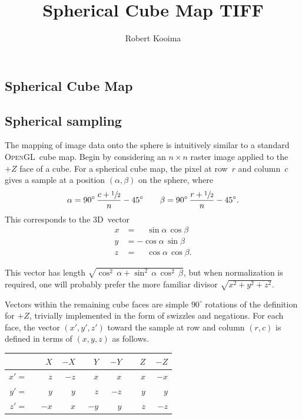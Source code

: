 \documentclass[oneside,11pt]{memoir}
\newcommand{\threed}  {3D}
\newcommand{\opengl}  {\textsc{OpenGL}}
\newcommand{\B}{\bigstrut[b]}
\newcommand{\T}{\bigstrut[t]}
\newcommand{\Pos}[1]{\phantom{-}{#1}}
\newcommand{\Neg}[1]{        {-}{#1}}
\begin{document}
\title{Spherical Cube Map TIFF}
\author{Robert Kooima}
\maketitle
\begin{Spacing}{1.1}




\chapter{Spherical Cube Map}

\section{Spherical sampling}

The mapping of image data onto the sphere is intuitively similar to a standard \opengl\ cube map. Begin by considering an $n\times n$ raster image applied to the $+Z$ face of a cube. For a spherical cube map, the pixel at row~$r$ and column~$c$ gives a sample at a position $(\alpha, \beta)$ on the sphere, where
\[\alpha=90^{\circ}\,\frac{c + \sfrac{1}{2}}{n} - 45^{\circ}\qquad\beta=90^{\circ}\,\frac{r + \sfrac{1}{2}}{n} - 45^{\circ}.\]
This corresponds to the \threed\ vector
\begin{align*}
x& = \phantom{-}\sin\alpha\, \cos\beta\\
y& =         {-}\cos\alpha\, \sin\beta\\
z& = \phantom{-}\cos\alpha\, \cos\beta.
\end{align*}

This vector has length \(\sqrt{\cos^2\,\alpha + \sin^2\,\alpha\,\cos^2\,\beta}\), but when normalization is required, one will probably prefer the more familiar divisor \(\sqrt{x^2+y^2+z^2}\).

Vectors within the remaining cube faces are simple $90^\circ$ rotations of the definition for $+Z$, trivially implemented in the form of swizzles and negations. For each face, the vector $(x', y', z')$ toward the sample at row and column $(r, c)$ is defined in terms of $(x, y, z)$ as follows.
\begin{center}
\begin{tabular}{rr|r|r|r|r|r}
    &$\Pos{X}$&$\Neg{X}$&$\Pos{Y}$&$\Neg{Y}$&$\Pos{Z}$&$\Neg{Z}$\B\\\hline
$x'=$&$\Pos{z}$&$\Neg{z}$&$\Pos{x}$&$\Pos{x}$&$\Pos{x}$&$\Neg{x}$\T\\
$y'=$&$\Pos{y}$&$\Pos{y}$&$\Pos{z}$&$\Neg{z}$&$\Pos{y}$&$\Pos{y}$\\
$z'=$&$\Neg{x}$&$\Pos{x}$&$\Neg{y}$&$\Pos{y}$&$\Pos{z}$&$\Neg{z}$\\
\end{tabular}
\end{center}


\end{Spacing}
\end{document}
